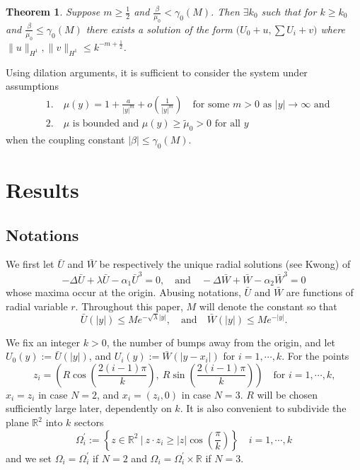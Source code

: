 \documentclass[a4paper,11pt]{article}
\newtheorem{theorem}{Theorem}
\numberwithin{step}{dummy}
\begin{document}
\begin{theorem} Suppose $m \ge \frac{1}{2}$ and $\frac{\beta}{\mu_0} <\gamma_0(M)$. Then $\exists k_0$ such that for $k\ge k_0$ and $\frac{\beta}{\mu_0} \le \gamma_0(M)$ there exists a solution of the form $\big(U_0 +u, \sum U_i + v\big)$ where 
$ \|u\|_{H^1},  \|v\|_{H^1} \le k^{-m + \frac{1}{2}}$.
 
\end{theorem}



Using dilation arguments, it is sufficient to consider the system under assumptions
\begin{equation}\tag{$A_1$}\label{A1}
 \begin{aligned}
  &1. \quad \mu(y) = 1 + \frac{a}{|y|^m} + o\left(\frac{1}{|y|^m}\right) \quad \text{for some $m>0$ as $|y| \rightarrow \infty$ and}\\
  &2. \quad \text{$\mu$ is bounded and $\mu(y)\ge \tilde{\mu}_0 > 0$ for all $y$}
 \end{aligned}
\end{equation}
when the coupling constant $|\beta| \le \gamma_0(M)$.

\section{Results}




\subsection{Notations}
We first let $\bar{U}$ and $\bar{W}$ be respectively the unique radial solutions (see Kwong) of 
\begin{equation*}
 -\Delta \bar{U} + \lambda \bar{U} - \alpha_1 \bar{U}^3 = 0, \quad \text{and} \quad -\Delta \bar{W} + \bar{W} - \alpha_2 \bar{W}^3 = 0
\end{equation*}
whose maxima occur at the origin. Abusing notations, $\bar{U}$ and $\bar{W}$ are functions of radial variable $r$. Throughout this paper, $M$ will denote the constant so that 
$$\bar{U}(|y|) \le Me^{-\sqrt{\lambda}|y|}, \quad \text{and} \quad \bar{W}(|y|) \le Me^{-|y|}.$$


We fix an integer $k>0$, the number of bumps away from the origin, and let $U_0(y):=\bar{U}(|y|)$, and $U_i(y):=\bar{W}(|y-x_i|)$ for $i=1,\cdots,k$. For the points 
$$z_i= \left( R \cos\left(\frac{2(i-1)\pi}{k}\right), ~R \sin\left(\frac{2(i-1)\pi}{k}\right)\right) \quad \text{for $i=1,\cdots,k$,}$$
$x_i = z_i$ in case $N=2$, and $x_i = (z_i,0)$ in case $N=3$. $R$ will be chosen sufficiently large later, dependently on $k$. It is also convenient to subdivide the plane $\mathbb{R}^2$ into $k$ sectors
$$\Omega^\prime_i := \left\{z \in \mathbb{R}^2~\Big|~ z\cdot z_i \ge |z|\cos\left(\frac{\pi}{k}\right)\right\} \quad i=1,\cdots,k$$
and we set $\Omega_i = \Omega^\prime_i$ if $N=2$ and $\Omega_i = \Omega^\prime_i \times \mathbb{R}$ if $N=3$.
\end{document}
